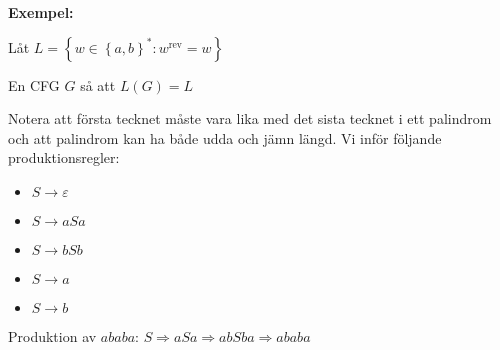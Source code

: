\newpage
\noindent\textbf{Exempel:}\par
\noindent Låt $L= \left\{w\in\left\{a,b\right\}^*:w^{\text{rev}}=w\right\}$\par
\noindent En CFG $G$ så att $L(G) = L$\par
\noindent Notera att första tecknet måste vara lika med det sista tecknet i ett palindrom och att palindrom kan ha både udda och jämn längd. Vi inför följande produktionsregler:
\begin{itemize}
  \item $S\to\varepsilon$
  \item $S\to aSa$
  \item $S\to bSb$
  \item $S\to a$
  \item $S\to b$
\end{itemize}
\par\bigskip
\noindent Produktion av $ababa$: $S\Rightarrow aSa\Rightarrow abSba\Rightarrow ababa$
